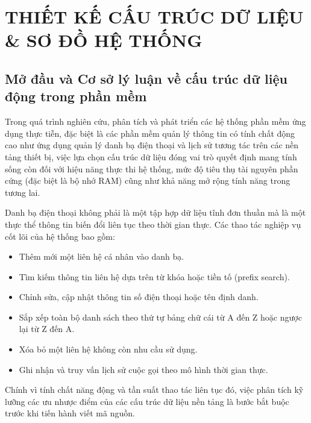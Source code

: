 \setcounter{chapter}{1} %
\chapter{THIẾT KẾ CẤU TRÚC DỮ LIỆU \& SƠ ĐỒ HỆ THỐNG}
\label{chap:thiet_ke_ctdl}

\section{Mở đầu và Cơ sở lý luận về cấu trúc dữ liệu động trong phần mềm}
Trong quá trình nghiên cứu, phân tích và phát triển các hệ thống phần mềm ứng dụng thực tiễn, đặc biệt là các phần mềm quản lý thông tin có tính chất động cao như ứng dụng quản lý danh bạ điện thoại và lịch sử tương tác trên các nền tảng thiết bị, việc lựa chọn cấu trúc dữ liệu đóng vai trò quyết định mang tính sống còn đối với hiệu năng thực thi hệ thống, mức độ tiêu thụ tài nguyên phần cứng (đặc biệt là bộ nhớ RAM) cũng như khả năng mở rộng tính năng trong tương lai.

Danh bạ điện thoại không phải là một tập hợp dữ liệu tĩnh đơn thuần mà là một thực thể thông tin biến đổi liên tục theo thời gian thực. Các thao tác nghiệp vụ cốt lõi của hệ thống bao gồm:
\begin{itemize}
    \item Thêm mới một liên hệ cá nhân vào danh bạ.
    \item Tìm kiếm thông tin liên hệ dựa trên từ khóa hoặc tiền tố (prefix search).
    \item Chỉnh sửa, cập nhật thông tin số điện thoại hoặc tên định danh.
    \item Sắp xếp toàn bộ danh sách theo thứ tự bảng chữ cái từ A đến Z hoặc ngược lại từ Z đến A.
    \item Xóa bỏ một liên hệ không còn nhu cầu sử dụng.
    \item Ghi nhận và truy vấn lịch sử cuộc gọi theo mô hình thời gian thực.
\end{itemize}

Chính vì tính chất năng động và tần suất thao tác liên tục đó, việc phân tích kỹ lưỡng các ưu nhược điểm của các cấu trúc dữ liệu nền tảng là bước bắt buộc trước khi tiến hành viết mã nguồn.

